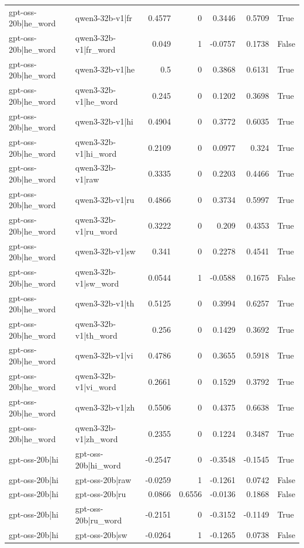 \begin{table}
\begin{tabular}{l l r r r r l}
gpt-oss-20b|he_word & qwen3-32b-v1|fr & 0.4577 & 0 & 0.3446 & 0.5709 & True \\
gpt-oss-20b|he_word & qwen3-32b-v1|fr_word & 0.049 & 1 & -0.0757 & 0.1738 & False \\
gpt-oss-20b|he_word & qwen3-32b-v1|he & 0.5 & 0 & 0.3868 & 0.6131 & True \\
gpt-oss-20b|he_word & qwen3-32b-v1|he_word & 0.245 & 0 & 0.1202 & 0.3698 & True \\
gpt-oss-20b|he_word & qwen3-32b-v1|hi & 0.4904 & 0 & 0.3772 & 0.6035 & True \\
gpt-oss-20b|he_word & qwen3-32b-v1|hi_word & 0.2109 & 0 & 0.0977 & 0.324 & True \\
gpt-oss-20b|he_word & qwen3-32b-v1|raw & 0.3335 & 0 & 0.2203 & 0.4466 & True \\
gpt-oss-20b|he_word & qwen3-32b-v1|ru & 0.4866 & 0 & 0.3734 & 0.5997 & True \\
gpt-oss-20b|he_word & qwen3-32b-v1|ru_word & 0.3222 & 0 & 0.209 & 0.4353 & True \\
gpt-oss-20b|he_word & qwen3-32b-v1|sw & 0.341 & 0 & 0.2278 & 0.4541 & True \\
gpt-oss-20b|he_word & qwen3-32b-v1|sw_word & 0.0544 & 1 & -0.0588 & 0.1675 & False \\
gpt-oss-20b|he_word & qwen3-32b-v1|th & 0.5125 & 0 & 0.3994 & 0.6257 & True \\
gpt-oss-20b|he_word & qwen3-32b-v1|th_word & 0.256 & 0 & 0.1429 & 0.3692 & True \\
gpt-oss-20b|he_word & qwen3-32b-v1|vi & 0.4786 & 0 & 0.3655 & 0.5918 & True \\
gpt-oss-20b|he_word & qwen3-32b-v1|vi_word & 0.2661 & 0 & 0.1529 & 0.3792 & True \\
gpt-oss-20b|he_word & qwen3-32b-v1|zh & 0.5506 & 0 & 0.4375 & 0.6638 & True \\
gpt-oss-20b|he_word & qwen3-32b-v1|zh_word & 0.2355 & 0 & 0.1224 & 0.3487 & True \\
gpt-oss-20b|hi & gpt-oss-20b|hi_word & -0.2547 & 0 & -0.3548 & -0.1545 & True \\
gpt-oss-20b|hi & gpt-oss-20b|raw & -0.0259 & 1 & -0.1261 & 0.0742 & False \\
gpt-oss-20b|hi & gpt-oss-20b|ru & 0.0866 & 0.6556 & -0.0136 & 0.1868 & False \\
gpt-oss-20b|hi & gpt-oss-20b|ru_word & -0.2151 & 0 & -0.3152 & -0.1149 & True \\
gpt-oss-20b|hi & gpt-oss-20b|sw & -0.0264 & 1 & -0.1265 & 0.0738 & False \\

\end{tabular}
\end{table}
